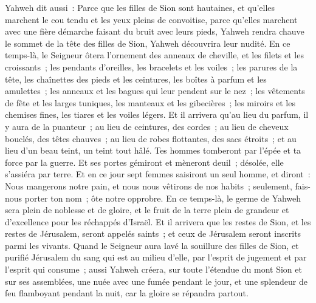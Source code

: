 \begin{multicols}{2}
Yahweh dit aussi~: Parce que les filles de Sion sont hautaines, et qu'elles marchent le cou tendu et les yeux pleins de convoitise, parce qu'elles marchent avec une fière démarche faisant du bruit avec leurs pieds,
Yahweh rendra chauve le sommet de la tête des filles de Sion, Yahweh découvrira leur nudité.
En ce temps-là, le Seigneur ôtera l'ornement des anneaux de cheville, et les filets et les croissants~;
les pendants d'oreilles, les bracelets et les voiles~;
les parures de la tête, les chaînettes des pieds et les ceintures, les boîtes à parfum et les amulettes~;
les anneaux et les bagues qui leur pendent sur le nez~;
les vêtements de fête et les larges tuniques, les manteaux et les gibecières~;
les miroirs et les chemises fines, les tiares et les voiles légers.
Et il arrivera qu'au lieu du parfum, il y aura de la puanteur~; au lieu de ceintures, des cordes~; au lieu de cheveux bouclés, des têtes chauves~; au lieu de robes flottantes, des sacs étroits~; et au lieu d'un beau teint, un teint tout hâlé.
Tes hommes tomberont par l'épée et ta force par la guerre.
Et ses portes gémiront et mèneront deuil~; désolée, elle s'assiéra par terre.
\VerseOne{}Et en ce jour sept femmes saisiront un seul homme, et diront~: Nous mangerons notre pain, et nous nous vêtirons de nos habits~; seulement, fais-nous porter ton nom~; ôte notre opprobre.
En ce temps-là, le germe de Yahweh sera plein de noblesse et de gloire, et le fruit de la terre plein de grandeur et d'excellence pour les réchappés d'Israël.
Et il arrivera que les restes de Sion, et les restes de Jérusalem, seront appelés saints~; et ceux de Jérusalem seront inscrits parmi les vivants.
Quand le Seigneur aura lavé la souillure des filles de Sion, et purifié Jérusalem du sang qui est au milieu d'elle, par l'esprit de jugement et par l'esprit qui consume~;
aussi Yahweh créera, sur toute l'étendue du mont Sion et sur ses assemblées, une nuée avec une fumée pendant le jour, et une splendeur de feu flamboyant pendant la nuit, car la gloire se répandra partout.

\end{multicols}
